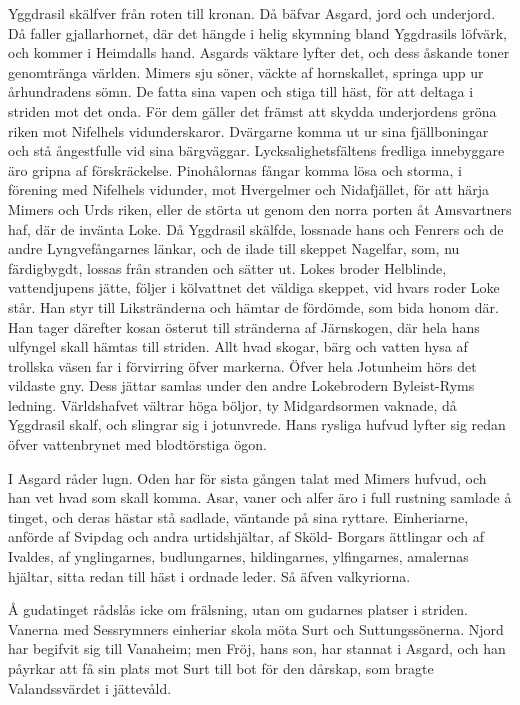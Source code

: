 Yggdrasil skälfver från roten till kronan. Då bäfvar Asgard, jord och
underjord. Då faller gjallarhornet, där det hängde i helig skymning
bland Yggdrasils löfvärk, och kommer i Heimdalls hand. Asgards väktare
lyfter det, och dess åskande toner genomtränga världen. Mimers sju
söner, väckte af hornskallet, springa upp ur århundradens sömn. De fatta
sina vapen och stiga till häst, för att deltaga i striden mot det onda.
För dem gäller det främst att skydda underjordens gröna riken mot
Nifelhels vidunderskaror. Dvärgarne
komma ut ur sina fjällboningar och stå ångestfulle vid sina bärgväggar.
Lycksalighetsfältens fredliga innebyggare äro gripna af förskräckelse.
Pinohålornas fångar komma lösa och storma, i förening med Nifelhels
vidunder, mot Hvergelmer och Nidafjället, för att härja Mimers och Urds
riken, eller de störta ut genom den norra porten åt Amsvartners haf, där
de invänta Loke. Då Yggdrasil skälfde, lossnade hans och Fenrers och de
andre Lyngvefångarnes länkar, och de ilade till skeppet Nagelfar, som,
nu färdigbygdt, lossas från stranden och sätter ut. Lokes broder
Helblinde, vattendjupens jätte, följer i kölvattnet det väldiga skeppet,
vid hvars roder Loke står. Han styr till Likstränderna och hämtar de
fördömde, som bida honom där. Han tager därefter kosan österut till
stränderna af Järnskogen, där hela hans ulfyngel skall hämtas till
striden. Allt hvad skogar, bärg och vatten hysa af trollska väsen far i
förvirring öfver markerna. Öfver hela Jotunheim hörs det vildaste gny.
Dess jättar samlas under den andre Lokebrodern Byleist-Ryms ledning.
Världshafvet vältrar höga böljor, ty Midgardsormen vaknade, då Yggdrasil
skalf, och slingrar sig i jotunvrede. Hans rysliga hufvud lyfter sig
redan öfver vattenbrynet med blodtörstiga ögon.

I Asgard råder lugn. Oden har för sista gången talat med Mimers hufvud,
och han vet hvad som skall komma. Asar, vaner och alfer äro i full
rustning samlade å tinget, och deras hästar stå sadlade, väntande på
sina ryttare. Einheriarne, anförde af Svipdag och andra urtidshjältar,
af Sköld- Borgars ättlingar och af Ivaldes, af ynglingarnes,
budlungarnes, hildingarnes, ylfingarnes, amalernas hjältar, sitta redan
till häst i ordnade leder. Så äfven valkyriorna.

Å gudatinget rådslås icke om frälsning, utan om gudarnes platser i
striden. Vanerna med Sessrymners einheriar skola möta Surt och
Suttungssönerna. Njord har begifvit sig till Vanaheim; men Fröj, hans
son, har stannat i Asgard, och han påyrkar att få sin plats mot Surt
till bot för den dårskap, som bragte Valandssvärdet i jättevåld.

